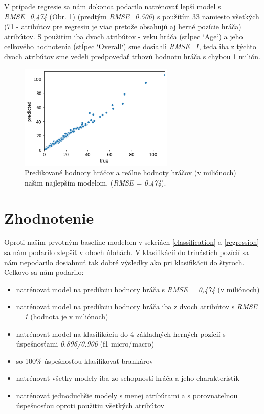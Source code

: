 \documentclass[runningheads]{llncs}
\begin{document}
V prípade regresie sa nám dokonca podarilo natrénovať lepší model s \\\textit{RMSE=0,474} (Obr. \ref{fig:gbt_regression}) (predtým \textit{RMSE=0.506}) s použítím 33 namiesto všetkých (71 - atribútov pre regresiu je viac pretože obsahujú aj herné pozície hráča) atribútov. S použitím iba dvoch atribútov - veku hráča (stĺpec `Age`) a jeho celkového hodnotenia (stĺpec `Overall`) sme dosiahli \textit{RMSE=1}, teda iba z týchto dvoch atribútov sme vedeli predpovedať trhovú hodnotu hráča s chybou 1 milión.

\begin{figure}[htp]
    \centering
    \includegraphics[height=5cm]{images/gbt_regression}
    \caption{Predikované hodnoty hráčov a reálne hodnoty hráčov (v miliónoch) našim najlepším modelom. (\textit{RMSE = 0,474}).}
    \label{fig:gbt_regression}
\end{figure}


\section{Zhodnotenie}

Oproti našim prvotným baseline modelom v sekciách \ref{classification}  a \ref{regression} sa nám podarilo zlepšiť v oboch úlohách. V klasifikácií do trinástich pozícií sa nám nepodarilo dosiahnuť tak dobré výsledky ako pri klasifikácii do štyroch. Celkovo sa nám podarilo:
\begin{itemize}
    \item natrénovať model na predikciu hodnoty hráča s \textit{RMSE = 0,474} (v miliónoch)
    \item natrénovať model na predikciu hodnoty hráča iba z dvoch atribútov s \textit{RMSE = 1} (hodnota je v miliónoch)
    \item natrénovať model na klasifikáciu do 4 základných herných pozícií s úspešnosťami \textit{0.896/0.906} (f1 micro/macro)
    \item so 100\% úspešnosťou klasifikovať brankárov
    \item natrénovať všetky modely iba zo schopností hráča a jeho charakteristík
    \item natrénovať jednoduchšie modely s menej atribútami a s porovnateľnou úspešnosťou oproti použitiu všetkých atribútov
\end{itemize}
\end{document}
